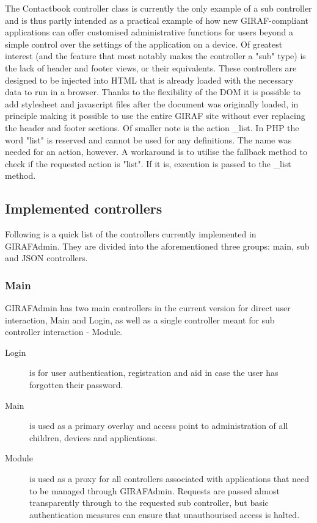 The Contactbook controller class is currently the only example of a sub controller and is thus partly intended as a practical example of how new GIRAF-compliant applications can offer customised administrative functions for users beyond a simple control over the settings of the application on a device.
Of greatest interest (and the feature that most notably makes the controller a "sub" type) is the lack of header and footer views, or their equivalents. These controllers are designed to be injected into HTML that is already loaded with the necessary data to run in a browser. Thanks to the flexibility of the DOM it is possible to add stylesheet and javascript files after the document was originally loaded, in principle making it possible to use the entire GIRAF site without ever replacing the header and footer sections.
Of smaller note is the action  \_list. In PHP the word "list" is reserved and cannot be used for any definitions. The name was needed for an action, however. A workaround is to utilise the fallback method to check if the requested action is "list". If it is, execution is passed to the \_list method.

\subsection{Implemented controllers}
Following is a quick list of the controllers currently implemented in GIRAFAdmin. They are divided into the aforementioned three groups: main, sub and JSON controllers.

\subsubsection*{Main}
GIRAFAdmin has two main controllers in the current version for direct user interaction, Main and Login, as well as a single controller meant for sub controller interaction - Module.
\begin{description}
    \item[Login] is for user authentication, registration and aid in case the user has forgotten their password.
    \item[Main] is used as a primary overlay and access point to administration of all children, devices and applications.
    \item[Module] is used as a proxy for all controllers associated with applications that need to be managed through GIRAFAdmin. Requests are passed almost transparently through to the requested sub controller, but basic authentication measures can ensure that unauthourised access is halted.
\end{description}

